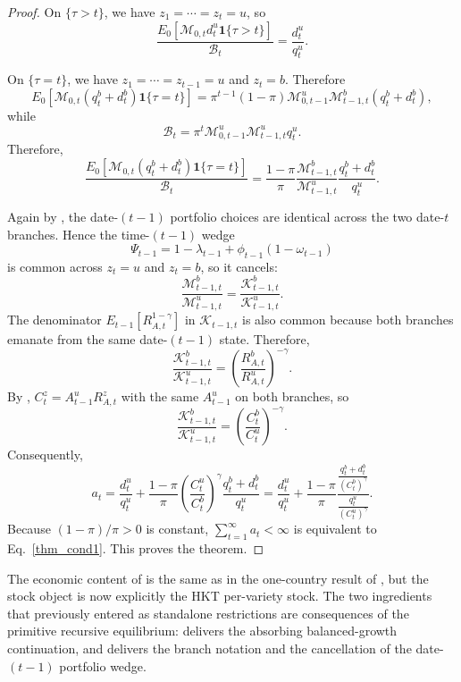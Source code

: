 \documentclass{article}
\begin{document}
\begin{proof}
On $\{\tau>t\}$, we have $z_1=\cdots=z_t=u$, so
\[
\frac{
E_0\!\left[\mathcal M_{0,t}d_t^u\mathbf 1\{\tau>t\}\right]
}{
\mathcal B_t
}
=
\frac{d_t^u}{q_t^u}.
\]

On $\{\tau=t\}$, we have $z_1=\cdots=z_{t-1}=u$ and $z_t=b$. Therefore
\[
E_0\!\left[\mathcal M_{0,t}(q_t^b+d_t^b)\mathbf 1\{\tau=t\}\right]
=
\pi^{t-1}(1-\pi)\mathcal M_{0,t-1}^u\mathcal M_{t-1,t}^b(q_t^b+d_t^b),
\]
while
\[
\mathcal B_t
=
\pi^t\mathcal M_{0,t-1}^u\mathcal M_{t-1,t}^u q_t^u.
\]
Therefore,
\[
\frac{
E_0\!\left[\mathcal M_{0,t}(q_t^b+d_t^b)\mathbf 1\{\tau=t\}\right]
}{
\mathcal B_t
}
=
\frac{1-\pi}{\pi}
\frac{\mathcal M_{t-1,t}^b}{\mathcal M_{t-1,t}^u}
\frac{q_t^b+d_t^b}{q_t^u}.
\]

Again by , the date-$(t-1)$ portfolio choices are identical across the two date-$t$ branches. Hence the time-$(t-1)$ wedge
\[
\Psi_{t-1}=1-\lambda_{t-1}+\phi_{t-1}(1-\omega_{t-1})
\]
is common across $z_t=u$ and $z_t=b$, so it cancels:
\[
\frac{\mathcal M_{t-1,t}^b}{\mathcal M_{t-1,t}^u}
=
\frac{\mathcal K_{t-1,t}^b}{\mathcal K_{t-1,t}^u}.
\]
The denominator $E_{t-1}[R_{A,t}^{1-\gamma}]$ in $\mathcal K_{t-1,t}$ is also common because both branches emanate from the same date-$(t-1)$ state. Therefore,
\[
\frac{\mathcal K_{t-1,t}^b}{\mathcal K_{t-1,t}^u}
=
\left(\frac{R_{A,t}^b}{R_{A,t}^u}\right)^{-\gamma}.
\]
By , $C_t^z=A_{t-1}^uR_{A,t}^z$ with the same $A_{t-1}^u$ on both branches, so
\[
\frac{\mathcal K_{t-1,t}^b}{\mathcal K_{t-1,t}^u}
=
\left(\frac{C_t^b}{C_t^u}\right)^{-\gamma}.
\]
Consequently,
\[
a_t
=
\frac{d_t^u}{q_t^u}
+
\frac{1-\pi}{\pi}
\left(\frac{C_t^u}{C_t^b}\right)^\gamma
\frac{q_t^b+d_t^b}{q_t^u}
=
\frac{d_t^u}{q_t^u}
+
\frac{1-\pi}{\pi}
\frac{\frac{q_t^b+d_t^b}{(C_t^b)^\gamma}}{\frac{q_t^u}{(C_t^u)^\gamma}}.
\]
Because $(1-\pi)/\pi>0$ is constant, $\sum_{t=1}^\infty a_t<\infty$ is equivalent to Eq.~\eqref{thm_cond1}. This proves the theorem.
\end{proof}

The economic content of  is the same as in the one-country result of \citet{hirano2025technological}, but the stock object is now explicitly the HKT per-variety stock. The two ingredients that previously entered as standalone restrictions are consequences of the primitive recursive equilibrium:  delivers the absorbing balanced-growth continuation, and  delivers the branch notation and the cancellation of the date-$(t-1)$ portfolio wedge.
\end{document}
